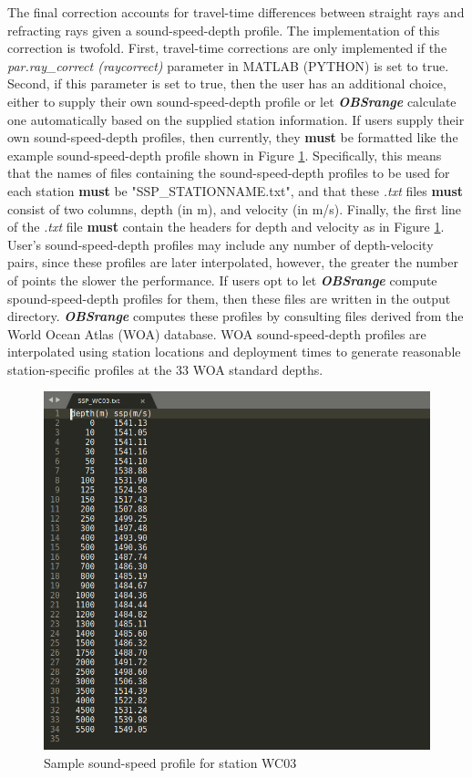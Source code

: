 \documentclass[titlepage, 12pt]{article}
\begin{document}
   The final correction accounts for travel-time differences between straight rays and refracting rays given a sound-speed-depth profile. The implementation of this correction is twofold. First, travel-time corrections are only implemented if the \textit{par.ray\_correct (raycorrect)} parameter in MATLAB (PYTHON) is set to true. Second, if this parameter is set to true, then the user has an additional choice, either to supply their own sound-speed-depth profile or let \textbf{\textit{OBSrange}} calculate one automatically based on the supplied station information. If users supply their own sound-speed-depth profiles, then currently, they \textbf{must} be formatted like the example sound-speed-depth profile shown in Figure \ref{fig:ssp}. Specifically, this means that the names of files containing the sound-speed-depth profiles to be used for each station \textbf{must} be "SSP\_STATIONNAME.txt", and that these \textit{.txt} files \textbf{must} consist of two columns, depth (in m), and velocity (in m/s). Finally, the first line of the \textit{.txt} file \textbf{must} contain the headers for depth and velocity as in Figure \ref{fig:ssp}. User's sound-speed-depth profiles may include any number of depth-velocity pairs, since these profiles are later interpolated, however, the greater the number of points the slower the performance. If users opt to let \textbf{\textit{OBSrange}} compute spound-speed-depth profiles for them, then these files are written in the output directory. \textbf{\textit{OBSrange}} computes these profiles by consulting files derived from the World Ocean Atlas (WOA) database. WOA sound-speed-depth profiles are interpolated using station locations and deployment times to generate reasonable station-specific profiles at the 33 WOA standard depths. 

   \begin{figure}[!htb]
    \includegraphics[width=\linewidth]{ssp.png}
    \caption{Sample sound-speed profile for station WC03}
    \label{fig:ssp}
   \end{figure}
\end{document}
